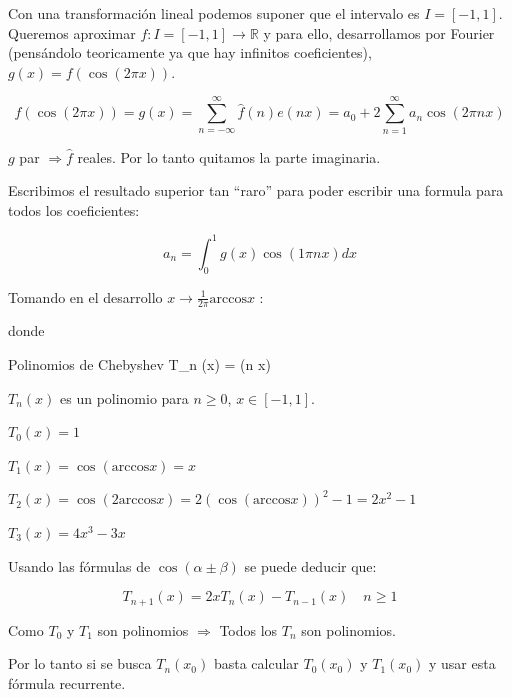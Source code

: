 		Con una transformación lineal podemos suponer que el intervalo es $I = [-1,1]$. Queremos aproximar $f: I = [-1,1] \rightarrow \mathbb{R}$ y para ello, desarrollamos por Fourier (pensándolo teoricamente ya que hay infinitos coeficientes), $g(x) = f(\cos(2 \pi x))$.

		$$f(\cos (2 \pi x)) = g(x) = \sum\limits^{\infty}_{n = -\infty} \hat{f}(n) e(nx) = a_0 + 2 \sum\limits^{\infty}_{n=1} a_n \cos(2 \pi nx)$$

		\begin{obs}
			$g$ par $\Rightarrow \hat{f}$ reales. Por lo tanto quitamos la parte imaginaria.
		\end{obs}

		Escribimos el resultado superior tan ``raro'' para poder escribir una formula para todos los coeficientes:

		$$ a_n = \int^{1}_0 g(x) \cos (1 \pi n x) dx $$

		Tomando en el desarrollo $x \rightarrow \frac{1}{2 \pi} \text{arccos} x$ :

		 donde 

		\begin{op}{Polinomios de Chebyshev}
			T_n (x) = \cos (n  x)
		\end{op}

		\begin{obs}
			$T_n (x)$ es un polinomio para $n \geq 0$, $x \in [-1,1]$.
		\end{obs}

		\begin{example}
			$T_0 (x) = 1$

			$T_1 (x) = \cos (\text{arccos} x) = x$

			$T_2 (x) = \cos (2 \text{arccos} x) = 2 (\cos (\text{arccos} x))^2 - 1 = 2x^2 - 1$

			$T_3 (x) = 4x^3 - 3x$
		\end{example}


		Usando las fórmulas de $\cos ( \alpha \pm \beta)$ se puede deducir que:

		$$T_{n+1} (x) = 2 x T_n (x) - T_{n-1} (x) \quad n \geq 1$$

		Como $T_0$ y $T_1$ son polinomios $\Rightarrow$ Todos los $T_n$ son polinomios.

		\begin{obs} 
			Por lo tanto si se busca $T_n (x_0)$ basta calcular $T_0 (x_0)$ y $T_1 (x_0)$ y usar esta fórmula recurrente.
		\end{obs}

